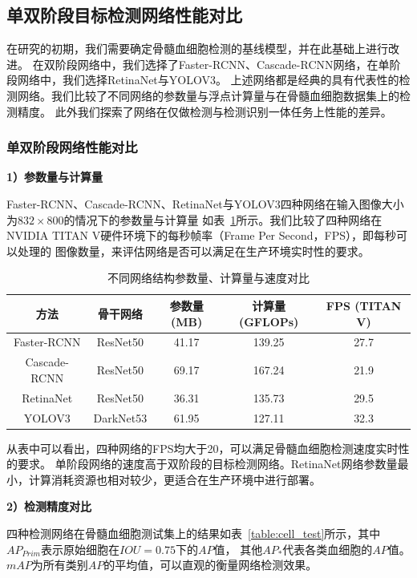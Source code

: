 \subsection{单双阶段目标检测网络性能对比}

在研究的初期，我们需要确定骨髓血细胞检测的基线模型，并在此基础上进行改进。
在双阶段网络中，我们选择了Faster-RCNN、Cascade-RCNN网络，在单阶段网络中，我们选择RetinaNet与YOLOV3。
上述网络都是经典的具有代表性的检测网络。我们比较了不同网络的参数量与浮点计算量与在骨髓血细胞数据集上的检测精度。
此外我们探索了网络在仅做检测与检测识别一体任务上性能的差异。

\subsubsection{单双阶段网络性能对比}

\textbf{1）参数量与计算量}

Faster-RCNN、Cascade-RCNN、RetinaNet与YOLOV3四种网络在输入图像大小为$832 \times 800$的情况下的参数量与计算量
如表~\ref{table:cell_Network}所示。我们比较了四种网络在NVIDIA TITAN V硬件环境下的每秒帧率（Frame Per Second，FPS），即每秒可以处理的
图像数量，来评估网络是否可以满足在生产环境实时性的要求。

\begin{table}
  \caption{不同网络结构参数量、计算量与速度对比}   
  \centering 
  \label{table:cell_Network}
  \begin{tabular}{ccccc}
    \toprule[2pt]
    方法 & 骨干网络  & 参数量(MB) & 计算量(GFLOPs) & FPS (TITAN V) \\
    \midrule[1.5pt] 
    Faster-RCNN & ResNet50 &  41.17 & 139.25 & 27.7 \\ 
    Cascade-RCNN & ResNet50 & 69.17 & 167.24 & 21.9   \\ 
    RetinaNet & ResNet50 & 36.31 & 135.73 & 29.5   \\ 
    YOLOV3 & DarkNet53 & 61.95 & 127.11 & 32.3  \\ 
    \bottomrule[2pt]      
  \end{tabular} 
\end{table}

从表中可以看出，四种网络的FPS均大于20，可以满足骨髓血细胞检测速度实时性的要求。
单阶段网络的速度高于双阶段的目标检测网络。RetinaNet网络参数量最小，计算消耗资源也相对较少，更适合在生产环境中进行部署。

\textbf{2）检测精度对比}

四种检测网络在骨髓血细胞测试集上的结果如表~\ref{table:cell_test}所示，其中$AP_{Prim}$表示原始细胞在$IOU=0.75$下的$AP$值，
其他$AP_{*}$代表各类血细胞的$AP$值。$mAP$为所有类别$AP$的平均值，可以直观的衡量网络检测效果。

